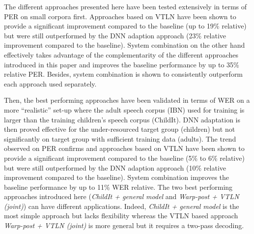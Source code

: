 \documentclass{nle}
\begin{document}
The different approaches presented here have been tested extensively in terms of PER on small corpora first. Approaches based on VTLN have been shown to provide a significant improvement compared to the baseline (up to 19\% relative) but were still outperformed by the DNN adaption approach (23\% relative improvement compared to the baseline). System combination on the other hand effectively takes advantage of the complementarity of the different approaches introduced in this paper and improves the baseline performance by up to 35\% relative PER. Besides, system combination is shown to consistently outperform each approach used separately.

Then, the best performing approaches have been validated in terms of WER on a more ``realistic'' set-up where the adult speech corpus (IBN) used for training is larger than the training children's speech corpus (ChildIt). DNN adaptation is then proved effective for the  under-resourced target group (children) but not significantly on target group with sufficient training data (adults). The trend observed on PER confirms and approaches based on VTLN have been shown to provide a significant improvement compared to the baseline (5\% to 6\% relative) but were still outperformed by the DNN adaption approach (10\% relative improvement compared to the baseline). System combination improves the baseline performance by up to 11\% WER relative. The two best performing approaches introduced here ({\em ChildIt + general model} and {\em Warp-post + VTLN (joint)}) can have different applications. Indeed, {\em ChildIt + general model} is the most simple approach but lacks flexibility  whereas the VTLN based approach {\em Warp-post + VTLN (joint)} is more general but it requires a two-pass decoding.



%
\end{document}
